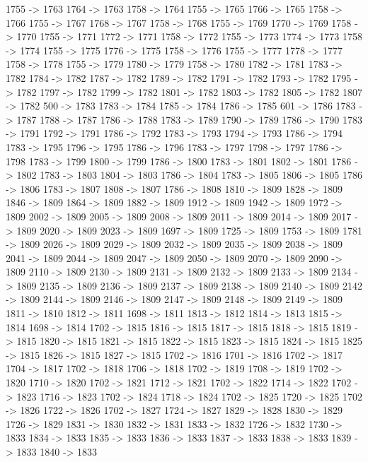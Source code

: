 {	1755 -> 1763
	1764 -> 1763
	1758 -> 1764
	1755 -> 1765
	1766 -> 1765
	1758 -> 1766
	1755 -> 1767
	1768 -> 1767
	1758 -> 1768
	1755 -> 1769
	1770 -> 1769
	1758 -> 1770
	1755 -> 1771
	1772 -> 1771
	1758 -> 1772
	1755 -> 1773
	1774 -> 1773
	1758 -> 1774
	1755 -> 1775
	1776 -> 1775
	1758 -> 1776
	1755 -> 1777
	1778 -> 1777
	1758 -> 1778
	1755 -> 1779
	1780 -> 1779
	1758 -> 1780
	1782 -> 1781
	1783 -> 1782
	1784 -> 1782
	1787 -> 1782
	1789 -> 1782
	1791 -> 1782
	1793 -> 1782
	1795 -> 1782
	1797 -> 1782
	1799 -> 1782
	1801 -> 1782
	1803 -> 1782
	1805 -> 1782
	1807 -> 1782
	500 -> 1783
	1783 -> 1784
	1785 -> 1784
	1786 -> 1785
	601 -> 1786
	1783 -> 1787
	1788 -> 1787
	1786 -> 1788
	1783 -> 1789
	1790 -> 1789
	1786 -> 1790
	1783 -> 1791
	1792 -> 1791
	1786 -> 1792
	1783 -> 1793
	1794 -> 1793
	1786 -> 1794
	1783 -> 1795
	1796 -> 1795
	1786 -> 1796
	1783 -> 1797
	1798 -> 1797
	1786 -> 1798
	1783 -> 1799
	1800 -> 1799
	1786 -> 1800
	1783 -> 1801
	1802 -> 1801
	1786 -> 1802
	1783 -> 1803
	1804 -> 1803
	1786 -> 1804
	1783 -> 1805
	1806 -> 1805
	1786 -> 1806
	1783 -> 1807
	1808 -> 1807
	1786 -> 1808
	1810 -> 1809
	1828 -> 1809
	1846 -> 1809
	1864 -> 1809
	1882 -> 1809
	1912 -> 1809
	1942 -> 1809
	1972 -> 1809
	2002 -> 1809
	2005 -> 1809
	2008 -> 1809
	2011 -> 1809
	2014 -> 1809
	2017 -> 1809
	2020 -> 1809
	2023 -> 1809
	1697 -> 1809
	1725 -> 1809
	1753 -> 1809
	1781 -> 1809
	2026 -> 1809
	2029 -> 1809
	2032 -> 1809
	2035 -> 1809
	2038 -> 1809
	2041 -> 1809
	2044 -> 1809
	2047 -> 1809
	2050 -> 1809
	2070 -> 1809
	2090 -> 1809
	2110 -> 1809
	2130 -> 1809
	2131 -> 1809
	2132 -> 1809
	2133 -> 1809
	2134 -> 1809
	2135 -> 1809
	2136 -> 1809
	2137 -> 1809
	2138 -> 1809
	2140 -> 1809
	2142 -> 1809
	2144 -> 1809
	2146 -> 1809
	2147 -> 1809
	2148 -> 1809
	2149 -> 1809
	1811 -> 1810
	1812 -> 1811
	1698 -> 1811
	1813 -> 1812
	1814 -> 1813
	1815 -> 1814
	1698 -> 1814
	1702 -> 1815
	1816 -> 1815
	1817 -> 1815
	1818 -> 1815
	1819 -> 1815
	1820 -> 1815
	1821 -> 1815
	1822 -> 1815
	1823 -> 1815
	1824 -> 1815
	1825 -> 1815
	1826 -> 1815
	1827 -> 1815
	1702 -> 1816
	1701 -> 1816
	1702 -> 1817
	1704 -> 1817
	1702 -> 1818
	1706 -> 1818
	1702 -> 1819
	1708 -> 1819
	1702 -> 1820
	1710 -> 1820
	1702 -> 1821
	1712 -> 1821
	1702 -> 1822
	1714 -> 1822
	1702 -> 1823
	1716 -> 1823
	1702 -> 1824
	1718 -> 1824
	1702 -> 1825
	1720 -> 1825
	1702 -> 1826
	1722 -> 1826
	1702 -> 1827
	1724 -> 1827
	1829 -> 1828
	1830 -> 1829
	1726 -> 1829
	1831 -> 1830
	1832 -> 1831
	1833 -> 1832
	1726 -> 1832
	1730 -> 1833
	1834 -> 1833
	1835 -> 1833
	1836 -> 1833
	1837 -> 1833
	1838 -> 1833
	1839 -> 1833
	1840 -> 1833
}
